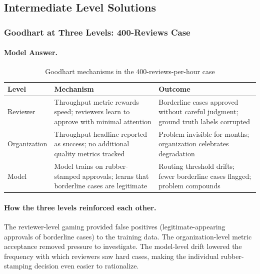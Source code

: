 \subsection{Intermediate Level Solutions}

\subsubsection{Goodhart at Three Levels: 400-Reviews Case}

\paragraph{Model Answer.}

\begin{table}[htbp]
\caption{Goodhart mechanisms in the 400-reviews-per-hour case}
\label{tab:goodhart-400}
\centering
\begin{tabular}{@{}p{3cm}p{4.5cm}p{5cm}@{}}
\toprule
\textbf{Level} & \textbf{Mechanism} & \textbf{Outcome} \\
\midrule
Reviewer & Throughput metric rewards speed; reviewers learn to approve with minimal attention & Borderline cases approved without careful judgment; ground truth labels corrupted \\
Organization & Throughput headline reported as success; no additional quality metrics tracked & Problem invisible for months; organization celebrates degradation \\
Model & Model trains on rubber-stamped approvals; learns that borderline cases are legitimate & Routing threshold drifts; fewer borderline cases flagged; problem compounds \\
\bottomrule
\end{tabular}
\end{table}

\paragraph{How the three levels reinforced each other.}

The reviewer-level gaming provided false positives (legitimate-appearing approvals of borderline cases) to the training data. The organization-level metric acceptance removed pressure to investigate. The model-level drift lowered the frequency with which reviewers saw hard cases, making the individual rubber-stamping decision even easier to rationalize.

